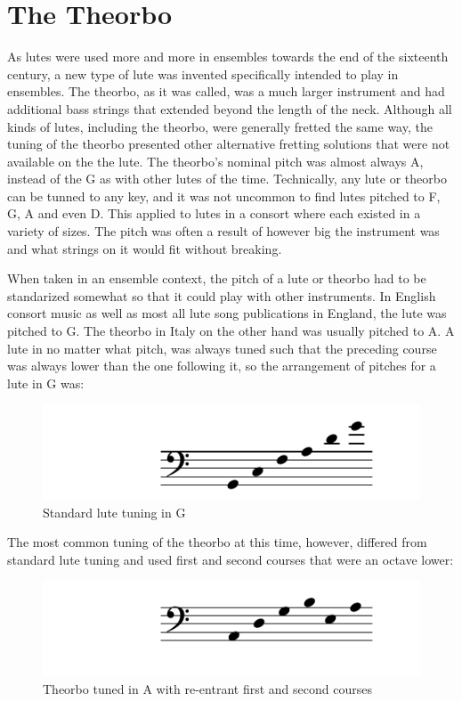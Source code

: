 \section{The Theorbo}

As lutes were used more and more in ensembles towards the end of the sixteenth century, a
new type of lute was invented specifically intended to play in ensembles.  The theorbo, as
it was called, was a much larger instrument and had additional bass strings that extended
beyond the length of the neck.  Although all kinds of lutes, including the theorbo, were
generally fretted the same way, the tuning of the theorbo presented other alternative
fretting solutions that were not available on the the lute.  The theorbo's nominal pitch
was almost always A, instead of the G as with other lutes of the time.  Technically, any
lute or theorbo can be tunned to any key, and it was not uncommon to find lutes pitched to
F, G, A and even D.  This applied to lutes in a consort where each existed in a variety of
sizes.  The pitch was often a result of however big the instrument was and what strings on
it would fit without breaking.

When taken in an ensemble context, the pitch of a lute or theorbo had to be standarized
somewhat so that it could play with other instruments.  In English consort music as well
as most all lute song publications in England, the lute was pitched to G.  The theorbo in
Italy on the other hand was usually pitched to A.  A lute in no matter what pitch, was
always tuned such that the preceding course was always lower than the one following it, so
the arrangement of pitches for a lute in G was:
\begin{figure}[h]
\centering
\includegraphics{examples/lute-tuning.pdf}
\caption{Standard lute tuning in G}
\end{figure}
The most common tuning of the theorbo at this time, however, differed from standard lute
tuning and used first and second courses that were an octave lower:
\begin{figure}[h]
\centering
\includegraphics{examples/theorbo-tuning.pdf}
\caption{Theorbo tuned in A with re-entrant first and second courses}
\end{figure}

